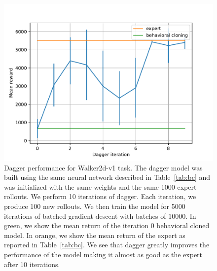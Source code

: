\documentclass{mwhittaker}
\newcommand{\tabref}[1]{Table~\ref{tab:#1}}
\begin{document}
\begin{figure}[h]
  \centering
  \includegraphics[width=\textwidth]{walker.pdf}
  \caption{
    Dagger performance for Walker2d-v1 task. The dagger model was built using
    the same neural network described in \tabref{bc} and was initialized with
    the same weights and the same 1000 expert rollouts. We perform 10
    iterations of dagger. Each iteration, we produce 100 new rollouts. We then
    train the model for 5000 iterations of batched gradient descent with
    batches of 10000. In green, we show the mean return of the iteration 0
    behavioral cloned model. In orange, we show the mean return of the expert
    as reported in \tabref{bc}. We see that dagger greatly improves the
    performance of the model making it almost as good as the expert after 10
    iterations.
  }
\end{figure}
\end{document}
